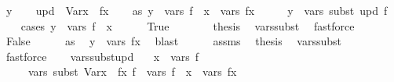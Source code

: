 \begin{isabellebody}
\ y\isanewline
\ \ \isamarkupfalse%
\ {\isacharquery}{\kern0pt}upd\ {\isacharequal}{\kern0pt}\ {\isachardoublequoteopen}Var{\isacharparenleft}{\kern0pt}x\ {\isacharcolon}{\kern0pt}{\isacharequal}{\kern0pt}\ fx{\isacharparenright}{\kern0pt}{\isachardoublequoteclose}\isanewline
\ \ \isamarkupfalse%
\ as{\isacharcolon}{\kern0pt}\ {\isachardoublequoteopen}y\ {\isasymin}\ vars\ f\ {\isacharminus}{\kern0pt}\ {\isacharbraceleft}{\kern0pt}x{\isacharbraceright}{\kern0pt}\ {\isasymunion}\ vars\ fx{\isachardoublequoteclose}\isanewline
\ \ \isamarkupfalse%
\ \isamarkupfalse%
\ {\isachardoublequoteopen}y\ {\isasymin}\ vars\ {\isacharparenleft}{\kern0pt}subst\ {\isacharquery}{\kern0pt}upd\ f{\isacharparenright}{\kern0pt}{\isachardoublequoteclose}\isanewline
\ \ \isamarkupfalse%
\ {\isacharparenleft}{\kern0pt}cases\ {\isachardoublequoteopen}y\ {\isasymin}\ vars\ f\ {\isacharminus}{\kern0pt}\ {\isacharbraceleft}{\kern0pt}x{\isacharbraceright}{\kern0pt}{\isachardoublequoteclose}{\isacharparenright}{\kern0pt}\isanewline
\ \ \ \ \isamarkupfalse%
\ True\isanewline
\ \ \ \ \isamarkupfalse%
\ \isamarkupfalse%
\ {\isacharquery}{\kern0pt}thesis\ \isamarkupfalse%
\ vars{\isacharunderscore}{\kern0pt}subst\ \isamarkupfalse%
\ fastforce\isanewline
\ \ \isamarkupfalse%
\isanewline
\ \ \ \ \isamarkupfalse%
\ False\isanewline
\ \ \ \ \isamarkupfalse%
\ as\ \isamarkupfalse%
\ {\isachardoublequoteopen}y\ {\isasymin}\ vars\ fx{\isachardoublequoteclose}\ \isamarkupfalse%
\ blast\isanewline
\ \ \ \ \isamarkupfalse%
\ assms\ \isamarkupfalse%
\ {\isacharquery}{\kern0pt}thesis\ \isamarkupfalse%
\ vars{\isacharunderscore}{\kern0pt}subst\ \isamarkupfalse%
\ fastforce\isanewline
\ \ \isamarkupfalse%
\isanewline
{}\isamarkupfalse%
%
\endisatagproof
{\isafoldproof}%
%
\isadelimproof
\isanewline
%
\endisadelimproof
\isanewline
{}\isamarkupfalse%
\ vars{\isacharunderscore}{\kern0pt}subst{\isacharunderscore}{\kern0pt}upd{\isacharcolon}{\kern0pt}\isanewline
\ \ \ {\isachardoublequoteopen}x\ {\isasymin}\ vars\ f{\isachardoublequoteclose}\isanewline
\ \ \ \ \ {\isachardoublequoteopen}vars\ {\isacharparenleft}{\kern0pt}subst\ {\isacharparenleft}{\kern0pt}Var{\isacharparenleft}{\kern0pt}x\ {\isacharcolon}{\kern0pt}{\isacharequal}{\kern0pt}\ fx{\isacharparenright}{\kern0pt}{\isacharparenright}{\kern0pt}\ f{\isacharparenright}{\kern0pt}\ {\isacharequal}{\kern0pt}\ vars\ f\ {\isacharminus}{\kern0pt}\ {\isacharbraceleft}{\kern0pt}x{\isacharbraceright}{\kern0pt}\ {\isasymunion}\ vars\ fx{\isachardoublequoteclose}\isanewline

\end{isabellebody}
